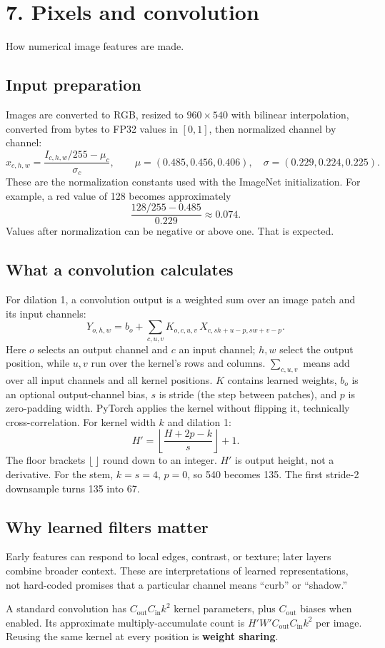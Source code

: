 \documentclass[11pt,letterpaper]{article}
\newcommand{\guidepage}[2]{\clearpage\pdfbookmark[0]{#1}{guide-\thepage}\section*{#1}{\sffamily\color{muted}#2}\par\vspace{5pt}}
\begin{document}
\guidepage{7. Pixels and convolution}{How numerical image features are made.}
\subsection*{Input preparation}
Images are converted to RGB, resized to $960\times540$ with bilinear interpolation, converted from bytes to FP32 values in $[0,1]$, then normalized channel by channel:
\[
x_{c,h,w}=\frac{I_{c,h,w}/255-\mu_c}{\sigma_c},
\qquad \mu=(0.485,0.456,0.406),\quad \sigma=(0.229,0.224,0.225).
\]
These are the normalization constants used with the ImageNet initialization. For example, a red value of 128 becomes approximately
\[
\frac{128/255-0.485}{0.229}\approx0.074.
\]
Values after normalization can be negative or above one. That is expected.

\subsection*{What a convolution calculates}
For dilation 1, a convolution output is a weighted sum over an image patch and its input channels:
\[
Y_{o,h,w}=b_o+\sum_{c,u,v} K_{o,c,u,v}\,X_{c,sh+u-p,sw+v-p}.
\]
Here $o$ selects an output channel and $c$ an input channel; $h,w$ select the output position, while $u,v$ run over the kernel's rows and columns. $\sum_{c,u,v}$ means add over all input channels and all kernel positions. $K$ contains learned weights, $b_o$ is an optional output-channel bias, $s$ is stride (the step between patches), and $p$ is zero-padding width. PyTorch applies the kernel without flipping it, technically cross-correlation. For kernel width $k$ and dilation 1:
\[
H'=\left\lfloor\frac{H+2p-k}{s}\right\rfloor+1.
\]
The floor brackets $\lfloor\ \rfloor$ round down to an integer. $H'$ is output height, not a derivative. For the stem, $k=s=4$, $p=0$, so 540 becomes 135. The first stride-2 downsample turns 135 into 67.

\subsection*{Why learned filters matter}
Early features can respond to local edges, contrast, or texture; later layers combine broader context. These are interpretations of learned representations, not hard-coded promises that a particular channel means ``curb'' or ``shadow.''

A standard convolution has $C_{\mathrm{out}}C_{\mathrm{in}}k^2$ kernel parameters, plus $C_{\mathrm{out}}$ biases when enabled. Its approximate multiply-accumulate count is $H'W'C_{\mathrm{out}}C_{\mathrm{in}}k^2$ per image. Reusing the same kernel at every position is \textbf{weight sharing}.
\end{document}
